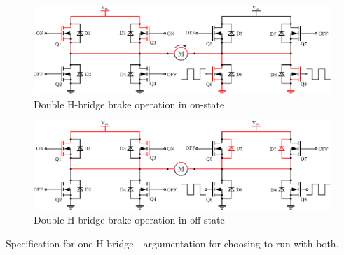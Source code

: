 \begin{figure}[H]
	\centering
	\includegraphics[scale=.6]{figures/DoubleHbridgeBrakeON.pdf}
	\caption{Double H-bridge brake operation in on-state}
	\label{DoubleHbridgeBrakeON}
\end{figure}

\begin{figure}[H]
	\centering
	\includegraphics[scale=.6]{figures/DoubleHbridgeBrakeOFF.pdf}
	\caption{Double H-bridge brake operation in off-state}
	\label{DoubleHbridgeBrakeOFF}
\end{figure}

Specification for one H-bridge - argumentation for choosing to run with both.
